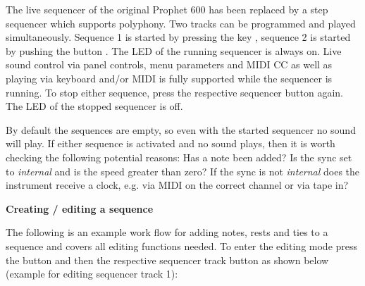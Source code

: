 The live sequencer of the original Prophet 600 has been replaced by a step sequencer which supports polyphony. Two tracks can be programmed and played simultaneously. Sequence 1 is started by pressing the key \seqone, sequence 2 is started by pushing the button \seqtwo. The LED of the running sequencer is always on. Live sound control via panel controls, menu parameters and MIDI CC as well as playing via keyboard and/or MIDI is fully supported while the sequencer is running. To stop either sequence, press the respective sequencer button again. The LED of the stopped sequencer is off. 

By default the sequences are empty, so even with the started sequencer no sound will play. If either sequence is activated and no sound plays, then it is worth checking the following potential reasons: Has a note been added? Is the sync set to \textit{internal} and is the speed greater than zero? If the sync is not \textit{internal} does the instrument receive a clock, e.g. via MIDI on the correct channel or via tape in?

\textbf{Creating / editing a sequence}

The following is an example work flow for adding notes, rests and ties to a sequence and covers all editing functions needed. To enter the editing mode press the \record button and then the respective sequencer track button as shown below (example for editing sequencer track 1):

\begin{center}
  
\end{center}

